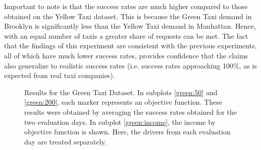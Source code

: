 Important to note is that the success rates are much higher compared to those obtained on the Yellow Taxi dataset. This is because the Green Taxi demand in Brooklyn is significantly less than the Yellow Taxi demand in Manhattan. Hence, with an equal number of taxis a greater share of requests can be met. The fact that the findings of this experiment are consistent with the previous experiments, all of which have much lower success rates, provides confidence that the claims also generalize to realistic success rates (i.e. success rates approaching 100\%, as is expected from real taxi companies).

\begin{figure}[H]
\centering
\captionsetup{justification=centering}
\caption{Results for the Green Taxi Dataset. In subplots \ref{green:50} and \ref{green:200}, each marker represents an objective function. These results were obtained by averaging the success rates obtained for the two evaluation days. In subplot \ref{green:income}, the income by objective function is shown. Here, the drivers from each evaluation day are treated separately.}
\label{success_rates_green}
\end{figure}

